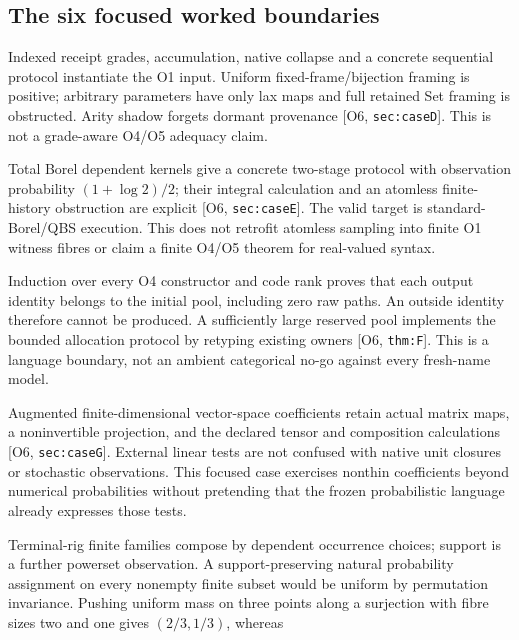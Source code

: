\documentclass[11pt,a4paper]{article}
\theoremstyle{definition}
\newcommand{\Addr}[2]{\textup{[#1, \texttt{#2}]}}
\begin{document}
\subsection{The six focused worked boundaries}
\begin{description}[style=nextline]
\item[D Origin-indexed provenance.]
Indexed receipt grades, accumulation, native collapse and a concrete
sequential protocol instantiate the O1 input. Uniform fixed-frame/bijection
framing is positive; arbitrary parameters have only lax maps and full
retained Set framing is obstructed. Arity shadow forgets dormant
provenance \Addr{O6}{sec:caseD}. This is not a grade-aware O4/O5 adequacy
claim.
\item[E Continuous dependent sensing.]
Total Borel dependent kernels give a concrete two-stage protocol with
observation probability \((1+\log 2)/2\); their integral calculation
and an atomless finite-history obstruction are explicit
\Addr{O6}{sec:caseE}. The valid target is standard-Borel/QBS execution.
This does not retrofit atomless sampling into finite O1 witness fibres or
claim a finite O4/O5 theorem for real-valued syntax.
\item[F Fresh allocation.]
Induction over every O4 constructor and code rank proves that each
output identity belongs to the initial pool, including zero raw paths.
An outside identity therefore cannot be produced. A sufficiently large
reserved pool implements the bounded allocation protocol by retyping
existing owners \Addr{O6}{thm:F}. This is a language boundary, not an
ambient categorical no-go against every fresh-name model.
\item[G Linear dataflow.]
Augmented finite-dimensional vector-space coefficients retain actual
matrix maps, a noninvertible projection, and the declared tensor and
composition calculations \Addr{O6}{sec:caseG}. External linear tests
are not confused with native unit closures or stochastic observations.
This focused case exercises nonthin coefficients beyond numerical
probabilities without pretending that the frozen probabilistic language
already expresses those tests.
\item[H Possibility does not select probability.]
Terminal-rig finite families compose by dependent occurrence choices;
support is a further powerset observation. A support-preserving natural
probability assignment on every nonempty finite subset would be uniform
by permutation invariance. Pushing uniform mass on three points along a
surjection with fibre sizes two and one gives \((2/3,1/3)\), whereas

\end{description}
\end{document}
